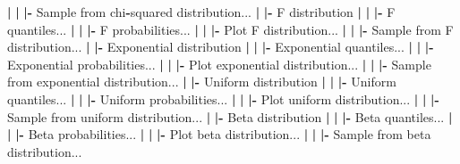 \documentclass[12pt,]{krantz}
\newenvironment{Shaded}{\begin{snugshade}}{\end{snugshade}}
\newcommand{\ErrorTok}[1]{\textcolor[rgb]{0.64,0.00,0.00}{\textbf{#1}}}
\newcommand{\NormalTok}[1]{#1}
\newcommand{\OperatorTok}[1]{\textcolor[rgb]{0.81,0.36,0.00}{\textbf{#1}}}
\newcommand{\StringTok}[1]{\textcolor[rgb]{0.31,0.60,0.02}{#1}}
\begin{document}
\begin{Shaded}
\begin{Highlighting}[]
  \OperatorTok{|}\StringTok{ }\ErrorTok{|}\StringTok{ }\ErrorTok{|}\OperatorTok{-}\StringTok{ }\NormalTok{Sample from chi}\OperatorTok{-}\NormalTok{squared distribution...}
  \OperatorTok{|}\StringTok{ }\ErrorTok{|}\OperatorTok{-}\StringTok{ }\NormalTok{F distribution}
  \OperatorTok{|}\StringTok{ }\ErrorTok{|}\StringTok{ }\ErrorTok{|}\OperatorTok{-}\StringTok{ }\NormalTok{F quantiles...}
  \OperatorTok{|}\StringTok{ }\ErrorTok{|}\StringTok{ }\ErrorTok{|}\OperatorTok{-}\StringTok{ }\NormalTok{F probabilities...}
  \OperatorTok{|}\StringTok{ }\ErrorTok{|}\StringTok{ }\ErrorTok{|}\OperatorTok{-}\StringTok{ }\NormalTok{Plot F distribution...}
  \OperatorTok{|}\StringTok{ }\ErrorTok{|}\StringTok{ }\ErrorTok{|}\OperatorTok{-}\StringTok{ }\NormalTok{Sample from F distribution...}
  \OperatorTok{|}\StringTok{ }\ErrorTok{|}\OperatorTok{-}\StringTok{ }\NormalTok{Exponential distribution}
  \OperatorTok{|}\StringTok{ }\ErrorTok{|}\StringTok{ }\ErrorTok{|}\OperatorTok{-}\StringTok{ }\NormalTok{Exponential quantiles...}
  \OperatorTok{|}\StringTok{ }\ErrorTok{|}\StringTok{ }\ErrorTok{|}\OperatorTok{-}\StringTok{ }\NormalTok{Exponential probabilities...}
  \OperatorTok{|}\StringTok{ }\ErrorTok{|}\StringTok{ }\ErrorTok{|}\OperatorTok{-}\StringTok{ }\NormalTok{Plot exponential distribution...}
  \OperatorTok{|}\StringTok{ }\ErrorTok{|}\StringTok{ }\ErrorTok{|}\OperatorTok{-}\StringTok{ }\NormalTok{Sample from exponential distribution...}
  \OperatorTok{|}\StringTok{ }\ErrorTok{|}\OperatorTok{-}\StringTok{ }\NormalTok{Uniform distribution}
  \OperatorTok{|}\StringTok{ }\ErrorTok{|}\StringTok{ }\ErrorTok{|}\OperatorTok{-}\StringTok{ }\NormalTok{Uniform quantiles...}
  \OperatorTok{|}\StringTok{ }\ErrorTok{|}\StringTok{ }\ErrorTok{|}\OperatorTok{-}\StringTok{ }\NormalTok{Uniform probabilities...}
  \OperatorTok{|}\StringTok{ }\ErrorTok{|}\StringTok{ }\ErrorTok{|}\OperatorTok{-}\StringTok{ }\NormalTok{Plot uniform distribution...}
  \OperatorTok{|}\StringTok{ }\ErrorTok{|}\StringTok{ }\ErrorTok{|}\OperatorTok{-}\StringTok{ }\NormalTok{Sample from uniform distribution...}
  \OperatorTok{|}\StringTok{ }\ErrorTok{|}\OperatorTok{-}\StringTok{ }\NormalTok{Beta distribution}
  \OperatorTok{|}\StringTok{ }\ErrorTok{|}\StringTok{ }\ErrorTok{|}\OperatorTok{-}\StringTok{ }\NormalTok{Beta quantiles...}
  \OperatorTok{|}\StringTok{ }\ErrorTok{|}\StringTok{ }\ErrorTok{|}\OperatorTok{-}\StringTok{ }\NormalTok{Beta probabilities...}
  \OperatorTok{|}\StringTok{ }\ErrorTok{|}\StringTok{ }\ErrorTok{|}\OperatorTok{-}\StringTok{ }\NormalTok{Plot beta distribution...}
  \OperatorTok{|}\StringTok{ }\ErrorTok{|}\StringTok{ }\ErrorTok{|}\OperatorTok{-}\StringTok{ }\NormalTok{Sample from beta distribution...}

\end{Highlighting}
\end{Shaded}
\end{document}
